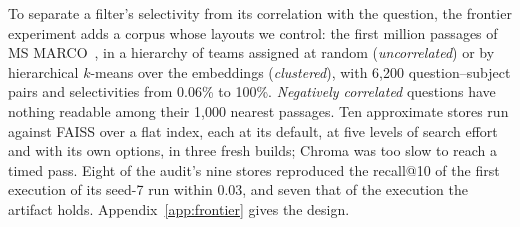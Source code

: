 To separate a filter's selectivity from its correlation with the question, the frontier experiment adds a corpus whose layouts we control: the first million
passages of MS MARCO~\cite{bajaj2016ms}, in a hierarchy of teams assigned at random (\emph{uncorrelated}) or by hierarchical $k$-means over the embeddings
(\emph{clustered}), with 6,200 question--subject pairs and selectivities from 0.06\% to 100\%. \emph{Negatively
correlated} questions have nothing readable among their 1,000 nearest passages. Ten approximate
stores run against FAISS over a flat index, each at its default, at five levels of search effort and with its own options, in three fresh builds; Chroma
was too slow to reach a timed pass. Eight of the audit's nine stores reproduced the recall@10 of the first execution of its seed-7 run within 0.03, and seven that of the execution the artifact holds. Appendix~\ref{app:frontier} gives
the design.


